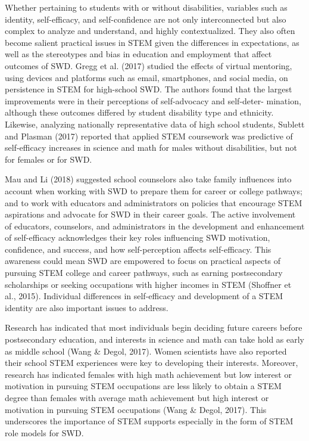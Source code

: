 \documentclass[11.5pt]{sig-alternate}
\begin{document}
\begin{large}
Whether pertaining to students with or without disabilities, variables such as identity, self-efficacy, and self-confidence are not only interconnected but also complex to analyze and understand, and highly contextualized. They also often become salient practical issues in STEM given the differences in expectations, as well as the stereotypes and bias in education and employment that affect outcomes of SWD. Gregg et al. (2017) studied the effects of virtual mentoring, using devices and platforms such as email, smartphones, and social media, on persistence in STEM for high-school SWD. The authors found that the largest improvements were in their perceptions of self-advocacy and self-deter- mination, although these outcomes differed by student disability type and ethnicity. Likewise, analyzing nationally representative data of high school students, Sublett and Plasman (2017) reported that applied STEM coursework was predictive of self-efficacy increases in science and math for males without disabilities, but not for females or for SWD. 

Mau and Li (2018) suggested school counselors also take family influences into account when working with SWD to prepare them for career or college pathways; and to work with educators and administrators on policies that encourage STEM aspirations and advocate for SWD in their career goals. The active involvement of educators, counselors, and administrators in the development and enhancement of self-efficacy acknowledges their key roles influencing SWD motivation, confidence, and success, and how self-perception affects self-efficacy. This awareness could mean SWD are empowered to focus on practical aspects of pursuing STEM college and career pathways, such as earning postsecondary scholarships or seeking occupations with higher incomes in STEM (Shoffner et al., 2015). Individual differences in self-efficacy and development of a STEM identity are also important issues to address. 

Research has indicated that most individuals begin deciding future careers before postsecondary education, and interests in science and math can take hold as early as middle school (Wang \& Degol, 2017). Women scientists have also reported their school STEM experiences were key to developing their interests. Moreover, research has indicated females with high math achievement but low interest or motivation in pursuing STEM occupations are less likely to obtain a STEM degree than females with average math achievement but high interest or motivation in pursuing STEM occupations (Wang \& Degol, 2017). This underscores the importance of STEM supports especially in the form of STEM role models for SWD.       


\end{large}
\end{document}
